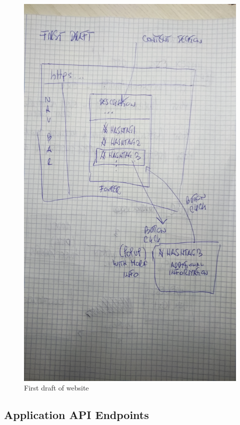 \documentclass[12pt]{article} %
\begin{document}
	\begin{figure}[H] %
	\includegraphics[width=0.6\linewidth]{images/first_draft}
	\caption{First draft of website}
	\label{firstDraft}
	\end{figure}

\subsection{Application API Endpoints}
\end{document}
